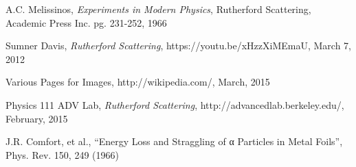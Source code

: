 \begin{thebibliography}{9}

  A.C. Melissinos, \emph{Experiments in Modern Physics}, Rutherford Scattering, Academic Press Inc. pg. 231-252, 1966

  Sumner Davis, \emph{Rutherford Scattering}, https://youtu.be/xHzzXiMEmaU, March 7, 2012

  Various Pages for Images, http://wikipedia.com/, March, 2015

  Physics 111 ADV Lab, \emph{Rutherford Scattering}, http://advancedlab.berkeley.edu/, February, 2015

J.R. Comfort, et al., ``Energy Loss and Straggling of α Particles in Metal Foils'', Phys. Rev. 150, 249 (1966)

\end{thebibliography}



